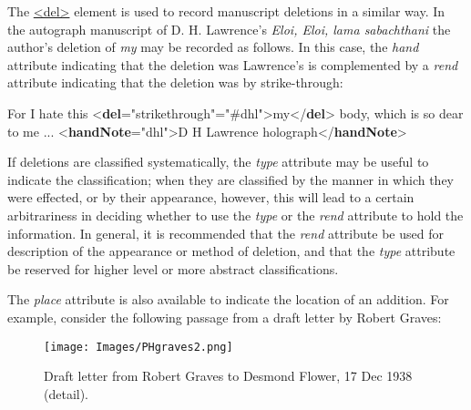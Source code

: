 The \hyperref[TEI.del]{<del>} element is used to record manuscript deletions in a similar way. In the autograph manuscript of D. H. Lawrence's \textit{Eloi, Eloi, lama sabachthani} the author's deletion of \textit{my} may be recorded as follows. In this case, the {\itshape hand} attribute indicating that the deletion was Lawrence's is complemented by a {\itshape rend} attribute indicating that the deletion was by strike-through: \par\bgroup{}\exampleFont \begin{shaded}\noindent\mbox{}For I hate this {<\textbf{del}\hspace*{1em}{rend}="{strikethrough}"\hspace*{1em}{hand}="{\#dhl}">}my{</\textbf{del}>} body, which is so dear to me ...\mbox{}\newline 
\mbox{}\newline 
{<\textbf{handNote}\hspace*{1em}{xml:id}="{dhl}">}D H Lawrence holograph{</\textbf{handNote}>}\end{shaded}\egroup\par \par
If deletions are classified systematically, the {\itshape type} attribute may be useful to indicate the classification; when they are classified by the manner in which they were effected, or by their appearance, however, this will lead to a certain arbitrariness in deciding whether to use the {\itshape type} or the {\itshape rend} attribute to hold the information. In general, it is recommended that the {\itshape rend} attribute be used for description of the appearance or method of deletion, and that the {\itshape type} attribute be reserved for higher level or more abstract classifications.\par
The {\itshape place} attribute is also available to indicate the location of an addition. For example, consider the following passage from a draft letter by Robert Graves: \begin{figure}[htbp]
\noindent\noindent\texttt{[image: Images/PHgraves2.png]}
\caption{Draft letter from Robert Graves to Desmond Flower, 17 Dec 1938 (detail). }\end{figure}
